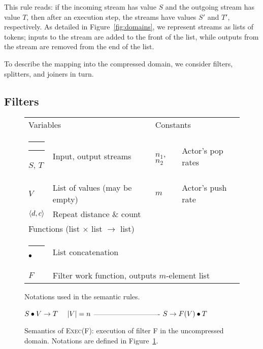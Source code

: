 This rule reads: if the incoming stream has value $S$ and the outgoing
stream has value $T$, then after an execution step, the streams have
values $S'$ and $T'$, respectively.  As detailed in
Figure~\ref{fig:domains}, we represent streams as lists of tokens;
inputs to the stream are added to the front of the list, while outputs
from the stream are removed from the end of the list.

To describe the mapping into the compressed domain, we consider
filters, splitters, and joiners in turn.

\subsection{Filters}

\newcommand{\tablesep}{\hspace{-3.5pt}}
\begin{figure}[t]
\hspace{-5pt}\begin{tabular}{llll}
\multicolumn{2}{l}{Variables} & \multicolumn{2}{l}{{\tablesep}Constants} \\ \rule[10pt]{1.9in}{0.3pt}\hspace{0.1in}\rule[10pt]{1.3in}{0.3pt}\hspace{-1.3in}\hspace{-2pt}\hspace{-1.97in}\hspace{-2pt}
$S$, $T$ & {\tablesep}Input, output streams & {\tablesep}$n_1$, $n_2$ & {\tablesep}Actor's pop rates \\
$V$ & {\tablesep}List of values (may be empty) & {\tablesep}$m$ & {\tablesep}Actor's push rate \\
$\langle d, c\rangle$ & {\tablesep}Repeat distance \& count & {\tablesep}~ & ~ \vspace{6pt} \\
\multicolumn{2}{l}{Functions (list $\times$ list $\rightarrow$ list)}& ~ & ~ \\ \rule[10pt]{3.3in}{0.3pt}\hspace{-3.3in}
$\bullet$ & {\tablesep}List concatenation & ~ & ~ \\
$F$ & \multicolumn{3}{l}{{\tablesep}Filter work function, outputs $m$-element list}
\end{tabular}
\caption{Notations used in the semantic rules.\protect\label{fig:notations}}
\end{figure}

\begin{figure}[t]
$S \bullet V \rightarrow T~~~~|V|=n$ \skiptopb
---------------------------- \skipbot
$S \rightarrow F(V) \bullet T$
\caption{Semantics of \textsc{Exec(F)}: execution of filter F in the
uncompressed domain.  Notations are defined in Figure~\ref{fig:notations}.
\protect\label{fig:exec-rule}}
\end{figure}

